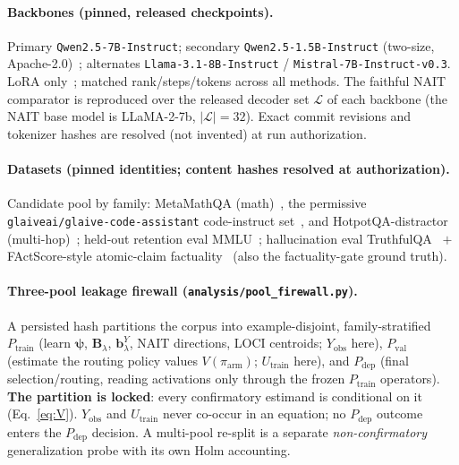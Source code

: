 \documentclass[11pt]{article}
\theoremstyle{definition}
\newcommand{\Blam}{\mathbf{B}_{\lambda}}
\newcommand{\Lset}{\mathcal{L}}
\newcommand{\psivec}{\bm{\psi}}
\newcommand{\Utr}{U_{\mathrm{train}}}
\newcommand{\Vpol}{V}
\begin{document}
\paragraph{Backbones (pinned, released checkpoints).}
Primary \texttt{Qwen2.5-7B-Instruct}; secondary \texttt{Qwen2.5-1.5B-Instruct} (two-size,
Apache-2.0)~\cite{qwen2025}; alternates \texttt{Llama-3.1-8B-Instruct} /
\texttt{Mistral-7B-Instruct-v0.3}. LoRA only~\cite{hu2022lora}; matched rank/steps/tokens
across all methods. The faithful NAIT comparator is reproduced over the released decoder
set $\Lset$ of each backbone (the NAIT base model is LLaMA-2-7b, $|\Lset|=32$). Exact commit
revisions and tokenizer hashes are resolved (not invented) at run authorization.

\paragraph{Datasets (pinned identities; content hashes resolved at authorization).}
Candidate pool by family: MetaMathQA (math)~\cite{yu2024metamath}, the permissive
\texttt{glaiveai/glaive-code-assistant} code-instruct set~\cite{glaive2023codeassistant},
and HotpotQA-distractor (multi-hop)~\cite{yang2018hotpotqa}; held-out
retention eval MMLU~\cite{hendrycks2021mmlu}; hallucination eval
TruthfulQA~\cite{lin2022truthfulqa} $+$ FActScore-style atomic-claim
factuality~\cite{min2023factscore} (also the factuality-gate ground truth).

\paragraph{Three-pool leakage firewall (\texttt{analysis/pool\_firewall.py}).}
A persisted hash partitions the corpus into example-disjoint, family-stratified
$P_{\mathrm{train}}$ (learn $\psivec$, $\Blam$, $\mathbf b_\lambda^Y$, NAIT directions,
LOCI centroids; $Y_{\mathrm{obs}}$ here), $P_{\mathrm{val}}$ (estimate the routing policy
values $\Vpol(\pi_{\mathrm{arm}})$; $\Utr$ here), and $P_{\mathrm{dep}}$ (final
selection/routing, reading activations only through the frozen $P_{\mathrm{train}}$
operators). \textbf{The partition is locked}: every confirmatory estimand is conditional on
it (Eq.~\eqref{eq:V}). $Y_{\mathrm{obs}}$ and $\Utr$ never co-occur in an equation; no
$P_{\mathrm{dep}}$ outcome enters the $P_{\mathrm{dep}}$ decision. A multi-pool re-split is
a separate \emph{non-confirmatory} generalization probe with its own Holm accounting.
\end{document}
